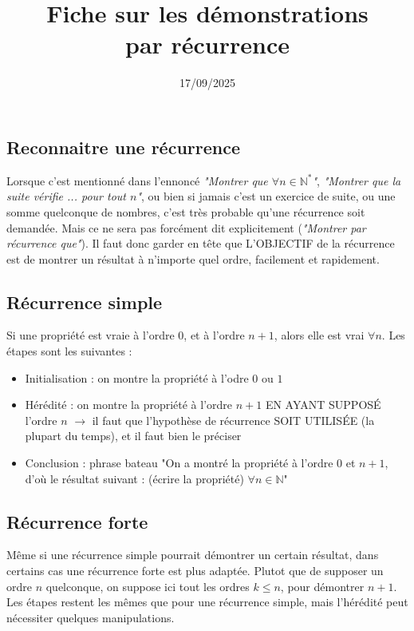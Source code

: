 \documentclass[12pt,a4paper]{article}
\title{Fiche sur les démonstrations\\par récurrence}
\date{17/09/2025}
\author{}
\begin{document}
\maketitle

\subsection*{Reconnaitre une récurrence}
Lorsque c'est mentionné dans l'ennoncé \textit{"Montrer que $\forall n \in \mathbb{N^*}$"}, \textit{"Montrer que la suite vérifie ... pour tout $n$"}, ou bien si jamais c'est un exercice de suite, ou une somme quelconque de nombres, c'est très probable qu'une récurrence soit demandée. Mais ce ne sera pas forcément dit explicitement (\textit{"Montrer par récurrence que"}). Il faut donc garder en tête que L'OBJECTIF de la récurrence est de montrer un résultat à n'importe quel ordre, facilement et rapidement. 


\subsection*{Récurrence simple}
Si une propriété est vraie à l'ordre $0$, et à l'ordre $n+1$, alors elle est vrai $\forall n$. Les étapes sont les suivantes :
\begin{itemize}
    \item Initialisation : on montre la propriété à l'odre $0$ ou $1$
    \item Hérédité : on montre la propriété à l'ordre $n+1$ EN AYANT SUPPOSÉ l'ordre $n$ $\to$ il faut que l'hypothèse de récurrence SOIT UTILISÉE (la plupart du temps), et il faut bien le préciser
    \item Conclusion : phrase bateau "On a montré la propriété à l'ordre $0$ et $n+1$, d'où le résultat suivant : (écrire la propriété) $\forall n \in \mathbb{N}$"

\end{itemize}

\subsection*{Récurrence forte}
Même si une récurrence simple pourrait démontrer un certain résultat, dans certains cas une récurrence forte est plus adaptée. Plutot que de supposer un ordre $n$ quelconque, on suppose ici tout les ordres $k\le n$, pour démontrer $n+1$.\\
Les étapes restent les mêmes que pour une récurrence simple, mais l'hérédité peut nécessiter quelques manipulations. 
\end{document}
